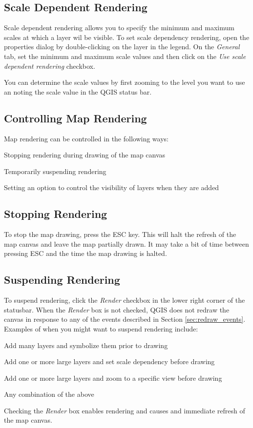 \subsection{Scale Dependent Rendering}
Scale dependent rendering allows you to specify the minimum and maximum scales
at which a layer wil be visible.  To set scale dependency rendering, open the
properties dialog by double-clicking on the layer in the legend. On the
\textit{General} tab, set the minimum and maximum scale values and then click on
the \textit{Use scale dependent rendering} checkbox.

You can determine the scale values by first zooming to the level you want to use
an noting the scale value in the QGIS status bar.
\subsection{Controlling Map Rendering}
Map rendering can be controlled in the following ways:
\begin{compactenum}
\item Stopping rendering during drawing of the map canvas
\item Temporarily suspending rendering
\item Setting an option to control the visibility of layers when they are added
\end{compactenum}
\subsection{Stopping Rendering}
To stop the map drawing, press the ESC key. This will halt the refresh of the
map canvas and leave the map partially drawn. It may take a bit of time between
pressing ESC and the time the map drawing is halted.
\subsection{Suspending Rendering}
To suspend rendering, click the \textit{Render} checkbox in the lower right
corner of the statusbar. When the \textit{Render} box is not checked, QGIS does
not redraw the canvas in response to any of the events described in Section
\ref{sec:redraw_events}. Examples of when you might want to suspend rendering
include:
\begin{compactitem}
\item Add many layers and symbolize them prior to drawing
\item Add one or more large layers and set scale dependency before drawing
\item Add one or more large layers and zoom to a specific view before drawing
\item Any combination of the above
\end{compactitem}
Checking the \textit{Render} box enables rendering and causes and immediate
refresh of the map canvas.
